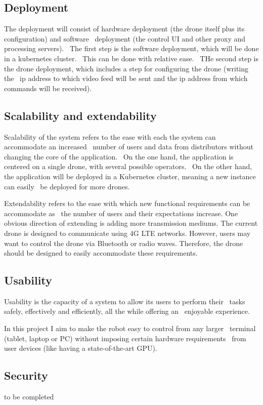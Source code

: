\subsection{Deployment}
\label{subsec:deployment}
The deployment will consist of hardware deployment (the drone itself plus its configuration) and software \
deployment (the control UI and other proxy and processing servers). \
The first step is the software deployment, which will be done in a kubernetes cluster. \
This can be done with relative ease. \
THe second step is the drone deployment, which includes a step for configuring the drone (writing the \
ip address to which video feed will be sent and the ip address from which commands will be received).

\subsection{Scalability and extendability}
\label{subsec:specification-scalability}
Scalability of the system refers to the ease with each the system can accommodate an increased \
number of users and data from distributors without changing the core of the application. \
On the one hand, the  application is centered on a single drone, with several possible operators. \
On the other hand, the application will be deployed in a Kubernetes cluster, meaning a new instance can easily \
be deployed for more drones.

Extendability refers to the ease with which new functional requirements can be accommodate as \
the number of users and their expectations increase.
One obvious direction of extending is adding more transmission mediums.
The current drone is designed to communicate using 4G LTE networks.
However, users may want to control the drone via Bluetooth or radio waves.
Therefore, the drone should be designed to easily accommodate these requirements.

\subsection{Usability}
\label{subsec:specification-usability}
Usability is the capacity of a system to allow its users to perform their \
tasks safely, effectively and efficiently, all the while offering an \
enjoyable experience.

In this project I aim to make the robot easy to control from any larger \
terminal (tablet, laptop or PC) without imposing certain hardware requirements \
from user devices (like having a state-of-the-art GPU).

\subsection{Security}
\label{subsec:specification-security}
to be completed